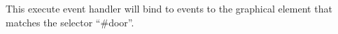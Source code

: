 This execute event handler will bind to events to the graphical element that matches the selector ``\#door''.




